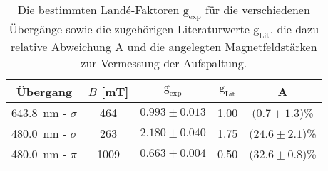     \begin{table}[h]
        \centering
        \caption{Die bestimmten Landé-Faktoren $\text{g}_{\text{exp}}$ für die verschiedenen Übergänge sowie die zugehörigen Literaturwerte $\text{g}_{\text{Lit}}$, die dazu relative Abweichung A und die angelegten Magnetfeldstärken zur Vermessung der Aufspaltung.}
        \label{tab:blau_pi}
    
        \begin{tabular}{c c c c c}
          \toprule
          {Übergang} & {$B$ [mT]} & {$\text{g}_{\text{exp}}$} & {$\text{g}_{\text{Lit}}$} & {A} \\ 
          \midrule
           \SI{643.8}{\nano\metre} - $\sigma$  & 464  & $0.993\pm0.013$  &   1.00      &  $(0.7\pm1.3$)\% \\
           \SI{480.0}{\nano\metre} - $\sigma$ & 263  & $2.180\pm0.040$  &   1.75      &  $(24.6\pm2.1$)\% \\
           \SI{480.0}{\nano\metre} - $\pi$    & 1009 & $0.663\pm0.004$  &   0.50      &  $(32.6\pm0.8$)\% \\

          \bottomrule
        \end{tabular}
      \end{table}
      \FloatBarrier
    
    
